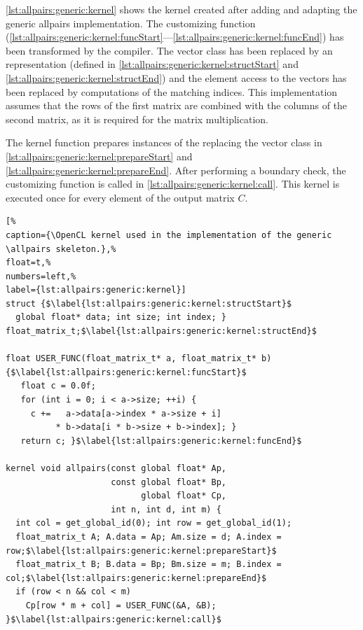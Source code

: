 \autoref{lst:allpairs:generic:kernel} shows the \OpenCL kernel created after adding and adapting the generic allpairs implementation.
The customizing function (\autoref{lst:allpairs:generic:kernel:funcStart}---\autoref{lst:allpairs:generic:kernel:funcEnd}) has been transformed by the  compiler.
The vector class has been replaced by an \OpenCL representation (defined in \autoref{lst:allpairs:generic:kernel:structStart} and \autoref{lst:allpairs:generic:kernel:structEnd}) and the element access to the vectors has been replaced by computations of the matching indices.
This implementation assumes that the rows of the first matrix are combined with the columns of the second matrix, as it is required for the matrix multiplication.

The  kernel function prepares instances of the  replacing the vector class in \autoref{lst:allpairs:generic:kernel:prepareStart} and \autoref{lst:allpairs:generic:kernel:prepareEnd}.
After performing a boundary check, the customizing function is called in \autoref{lst:allpairs:generic:kernel:call}.
This \OpenCL kernel is executed once for every element of the output matrix $C$.

\begin{lstlisting}[%
caption={\OpenCL kernel used in the implementation of the generic \allpairs skeleton.},%
float=t,%
numbers=left,%
label={lst:allpairs:generic:kernel}]
struct {$\label{lst:allpairs:generic:kernel:structStart}$
  global float* data; int size; int index; } float_matrix_t;$\label{lst:allpairs:generic:kernel:structEnd}$

float USER_FUNC(float_matrix_t* a, float_matrix_t* b) {$\label{lst:allpairs:generic:kernel:funcStart}$
   float c = 0.0f;
   for (int i = 0; i < a->size; ++i) {
     c +=   a->data[a->index * a->size + i]
          * b->data[i * b->size + b->index]; }
   return c; }$\label{lst:allpairs:generic:kernel:funcEnd}$

kernel void allpairs(const global float* Ap,
                     const global float* Bp,
                           global float* Cp,
                     int n, int d, int m) {
  int col = get_global_id(0); int row = get_global_id(1);
  float_matrix_t A; A.data = Ap; Am.size = d; A.index = row;$\label{lst:allpairs:generic:kernel:prepareStart}$
  float_matrix_t B; B.data = Bp; Bm.size = m; B.index = col;$\label{lst:allpairs:generic:kernel:prepareEnd}$
  if (row < n && col < m)
    Cp[row * m + col] = USER_FUNC(&A, &B); }$\label{lst:allpairs:generic:kernel:call}$
\end{lstlisting}

